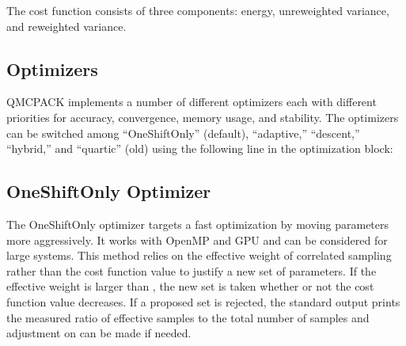 \documentclass[letterpaper,10pt,english]{sphinxmanual}
\begin{document}
The cost function consists of three components: energy, unreweighted variance, and reweighted variance.

\begin{sphinxVerbatim}[commandchars=\\\{\}]
                     
       
         
\end{sphinxVerbatim}


\subsection{Optimizers}
\label{\detokenize{methods:optimizers}}
QMCPACK implements a number of different optimizers each with different
priorities for accuracy, convergence, memory usage, and stability. The
optimizers can be switched among “OneShiftOnly” (default), “adaptive,”
“descent,” “hybrid,” and “quartic” (old) using the following line in the
optimization block:

\begin{sphinxVerbatim}[commandchars=\\\{\}]
      
\end{sphinxVerbatim}


\subsection{OneShiftOnly Optimizer}
\label{\detokenize{methods:oneshiftonly-optimizer}}
The OneShiftOnly optimizer targets a fast optimization by moving parameters more aggressively. It works with OpenMP and GPU and can be considered for large systems.
This method relies on the effective weight of correlated sampling rather than the cost function value to justify a new set of parameters.
If the effective weight is larger than , the new set is taken whether or not the cost function value decreases.
If a proposed set is rejected, the standard output prints the measured ratio of effective samples to the total number of samples
and adjustment on  can be made if needed.
\end{document}
